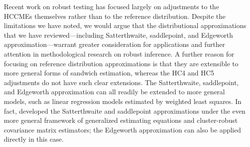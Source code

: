 \documentclass[12pt]{article}\usepackage[]{graphicx}\usepackage[]{color}
\begin{document}
Recent work on robust testing has focused largely on adjustments to the HCCMEs themselves \citep[e.g.,][]{Li2016new, Hartigan2016alternative} rather than to the reference distribution. 
Despite the limitations we have noted, we would argue that the distributional approximations that we have reviewed---including Satterthwaite, saddlepoint, and Edgeworth approximation---warrant greater consideration for applications and further attention in methodological research on robust inference. 
A further reason for focusing on reference distribution approximations is that they are extensible to more general forms of sandwich estimation, whereas the HC4 and HC5 adjustments do not have such clear extensions. The Satterthwaite, saddlepoint, and Edgeworth approximation can all readily be extended to more general models, such as linear regression models estimated by weighted least squares. In fact, \citet{McCaffrey2006improved} developed the Satterthwaite and saddlepoint approximations under the even more general framework of generalized estimating equations and cluster-robust covariance matrix estimators; the \citet{Kauermann2001note} Edgeworth approximation can also be applied directly in this case. 



\end{document}
